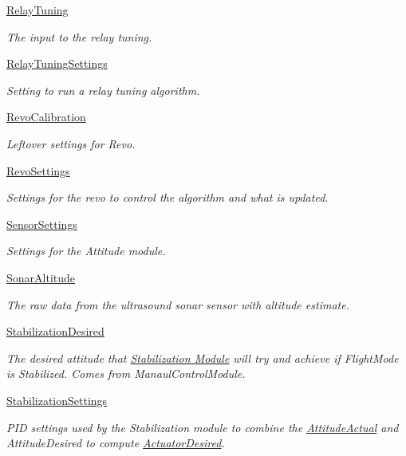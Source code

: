 \begin{DoxyCompactItemize}
\hyperlink{group___relay_tuning}{\-Relay\-Tuning}
\begin{DoxyCompactList}\small\item\em \-The input to the relay tuning. \end{DoxyCompactList}\item 
\hyperlink{group___relay_tuning_settings}{\-Relay\-Tuning\-Settings}
\begin{DoxyCompactList}\small\item\em \-Setting to run a relay tuning algorithm. \end{DoxyCompactList}\item 
\hyperlink{group___revo_calibration}{\-Revo\-Calibration}
\begin{DoxyCompactList}\small\item\em \-Leftover settings for \-Revo. \end{DoxyCompactList}\item 
\hyperlink{group___revo_settings}{\-Revo\-Settings}
\begin{DoxyCompactList}\small\item\em \-Settings for the revo to control the algorithm and what is updated. \end{DoxyCompactList}\item 
\hyperlink{group___sensor_settings}{\-Sensor\-Settings}
\begin{DoxyCompactList}\small\item\em \-Settings for the \-Attitude module. \end{DoxyCompactList}\item 
\hyperlink{group___sonar_altitude}{\-Sonar\-Altitude}
\begin{DoxyCompactList}\small\item\em \-The raw data from the ultrasound sonar sensor with altitude estimate. \end{DoxyCompactList}\item 
\hyperlink{group___stabilization_desired}{\-Stabilization\-Desired}
\begin{DoxyCompactList}\small\item\em \-The desired attitude that \hyperlink{group___stabilization_module}{\-Stabilization \-Module} will try and achieve if \-Flight\-Mode is \-Stabilized. \-Comes from \-Manaul\-Control\-Module. \end{DoxyCompactList}\item 
\hyperlink{group___stabilization_settings}{\-Stabilization\-Settings}
\begin{DoxyCompactList}\small\item\em \-P\-I\-D settings used by the \-Stabilization module to combine the \hyperlink{group___attitude_actual}{\-Attitude\-Actual} and \-Attitude\-Desired to compute \hyperlink{group___actuator_desired}{\-Actuator\-Desired}. \end{DoxyCompactList}\item 

\end{DoxyCompactItemize}
